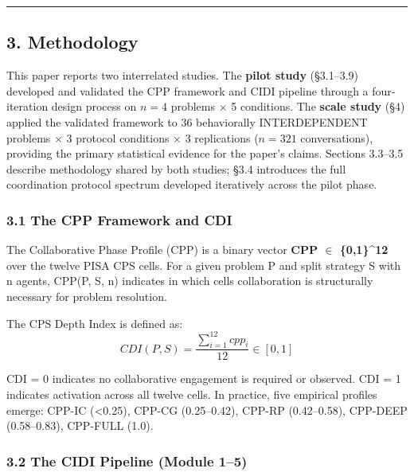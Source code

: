\documentclass[
  11pt,
]{article}
\begin{document}
\begin{center}\rule{0.5\linewidth}{0.5pt}\end{center}

\subsection{3. Methodology}\label{methodology}

This paper reports two interrelated studies. The \textbf{pilot study} (§3.1--3.9) developed and validated the CPP framework and CIDI pipeline through a four-iteration design process on $n=4$ problems $\times$ 5 conditions. The \textbf{scale study} (§4) applied the validated framework to 36 behaviorally INTERDEPENDENT problems $\times$ 3 protocol conditions $\times$ 3 replications ($n=321$ conversations), providing the primary statistical evidence for the paper's claims. Sections 3.3--3.5 describe methodology shared by both studies; §3.4 introduces the full coordination protocol spectrum developed iteratively across the pilot phase.

\subsubsection{3.1 The CPP Framework and
CDI}\label{the-cpp-framework-and-cdi}

The Collaborative Phase Profile (CPP) is a binary vector \textbf{CPP $\in$
\{0,1\}\^{}12} over the twelve PISA CPS cells. For a given problem P and
split strategy S with n agents, CPP(P, S, n) indicates in which cells
collaboration is structurally necessary for problem resolution.

The CPS Depth Index is defined as:
\[CDI(P, S) = \frac{\sum_{i=1}^{12} cpp_i}{12} \in [0, 1]\]

CDI = 0 indicates no collaborative engagement is required or observed.
CDI = 1 indicates activation across all twelve cells. In practice, five
empirical profiles emerge: CPP-IC (\textless0.25), CPP-CG (0.25--0.42),
CPP-RP (0.42--0.58), CPP-DEEP (0.58--0.83), CPP-FULL (1.0).

\subsubsection{3.2 The CIDI Pipeline (Module
1--5)}\label{the-cidi-pipeline-module-15}
\end{document}
